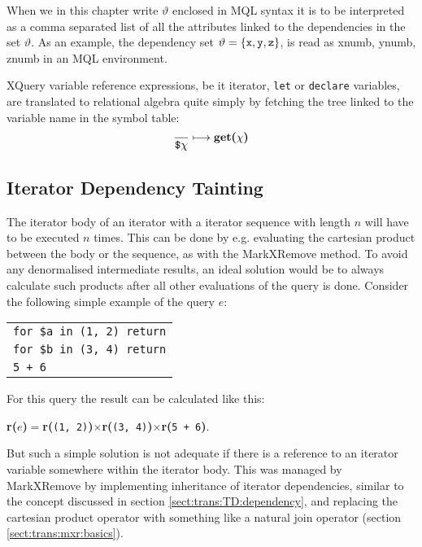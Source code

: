 When we in this chapter write $\vartheta$ enclosed in MQL syntax it is to be
interpreted as a comma separated list of all the attributes linked to the
dependencies in the set $\vartheta$. As an example, the dependency set
$\vartheta = \left\{\mbox{\texttt{x}},\mbox{\texttt{y}},\mbox{\texttt{z}}\right\}$, is read as \textsf{xnumb, ynumb, znumb} in an MQL environment.

XQuery variable reference expressions, be it iterator, \texttt{let} or \texttt{declare} variables, are translated
to relational algebra quite simply by fetching the tree linked to the variable name in the symbol table:
\begin{equation}
\frac{}{\mbox{\texttt{\$}}\chi}\longmapsto
\mbox{\textbf{get(}}\chi\mbox{\textbf{)}}
\label{rule:trans:TD:varRef}
\end{equation}


\subsection{Iterator Dependency Tainting}
\label{sect:trans:TD:tainting}

The iterator body of an iterator with a iterator sequence with length $n$ will
have to be executed $n$ times. This can be done by e.g. evaluating the cartesian
product between the body or the sequence, as with the MarkXRemove method. To
avoid any denormalised intermediate results, an ideal solution would be to
always calculate such products after all other evaluations of the query is
done. Consider the following simple example of the query $e$:

\begin{center}
\begin{tabular}{l}
\texttt{for \$a in (1, 2) return} \\ \qquad
\texttt{for \$b in (3, 4) return} \\ \qquad \qquad
\texttt{5 + 6}
\end{tabular}
\end{center}

For this query the result can be calculated like this:
\noindent
\begin{center}
\textbf{r(}$e$\textbf{)}$=$\textbf{r(}\texttt{(1, 2)}\textbf{)}$\times$\textbf{r(}\texttt{(3,
4)}\textbf{)}$\times$\textbf{r(}\texttt{5 + 6}\textbf{)}.
\end{center}
\noindent

But such a simple solution is not adequate if there is a reference to an iterator variable somewhere within the
iterator body. This was managed by MarkXRemove by implementing inheritance of iterator dependencies, similar to
the concept discussed in section \ref{sect:trans:TD:dependency}, and replacing the cartesian product operator with
something like a natural join operator (section \ref{sect:trans:mxr:basics}).

